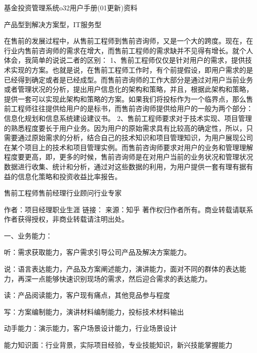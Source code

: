 \documentclass[letterpaper,12pt,english]{sphinxmanual}
\begin{document}

基金投资管理系统o32用户手册(01更新)资料

产品型到解决方案型，IT服务型

在售前的发展过程中，从售前工程师到售前咨询师，又是一个大的跨度。现在，在行业内售前咨询师的需求在增大，而售前工程师的需求缺并不见得有增长。就个人体会，我简单的说说二者的区别：
1、售前工程师仅仅是针对用户的需求，提供技术实现的方案。也就是说，在售前工程师工作时，有个前提假设，即用户需求的是已经得到确定或者是已经成型。而售前咨询师的工作大部分是通过对用户当前业务或者管理状况的分析，提出用户信息化的架构和策略，并且，根据此架构和策略，提供一套可以实现此架构和策略的方案。如果我们将投标作为一个临界点，那么售前工程师往往提供给用户的是标书，而售前咨询师提供给用户的一般为两个部分：信息化规划和信息系统建设建议书。
2、售前工程师要求对于技术实现、项目管理的熟悉程度要长于用户业务。因为用户的原始需求具有比较高的确定性，所以，只需要通过原始需求的分析，结合自己的技术知识和项目管理知识，为用户展现公司在某个项目上的技术和项目管理实例。而售前咨询师要求对用户的业务和管理理解程度要更高，即，更多的时候，售前咨询师是在对用户当前的业务状况和管理状况数据进行收集、统计和分析，通过对这些数据的利用，为用户提供一套有理有据有益的信息化策略和投资收益比率报告。

售前工程师\sphinxhyphen{}售前经理\sphinxhyphen{}行业顾问\sphinxhyphen{}行业专家


作者：项目经理职业生涯
链接：
来源：知乎
著作权归作者所有。商业转载请联系作者获得授权，非商业转载请注明出处。

一、业务能力：

听：需求获取能力，客户需求引导公司产品及解决方案能力。

说：语言表达能力，产品及方案阐述能力，演讲能力，面对不同的群体的表达能力，再深一点能够快速识别现场的需求，然后迎合需求的表达能力。

读：产品阅读能力，客户现有痛点，其他竞品参与程度

写：方案编制能力，演讲材料编制能力，投标技术材料输出

动手能力：演示能力，客户场景设计能力，行业场景设计

能力知识面：行业背景，实际项目经验，专业技能知识，新兴技能掌握能力
\end{document}
